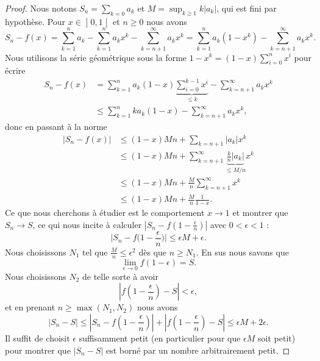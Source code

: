 \begin{proof}
    Nous notons \( S_n=\sum_{k=0}a_k\) et \( M=\sup_{k\geq 1}k| a_k |\), qui est fini par hypothèse. Pour \( x\in \mathopen] 0 , 1 \mathclose[\) et \( n\geq 0\) nous avons
    \begin{equation}
        S_n-f(x)=\sum_{k=1}^na_k-\sum_{k=1}^na_kx^k-\sum_{k=n+1}^{\infty}a_kx^k=\sum_{k=1}^na_k(1-x^k)-\sum_{k=n+1}^{\infty}a_kx^k.
    \end{equation}
    Nous utilisons la série géométrique sous la forme \( 1-x^k=(1-x)\sum_{i=0}^nx^i\) pour écrire
    \begin{subequations}
        \begin{align}
            S_n-f(x)&=\sum_{k=1}^na_k(1-x)\underbrace{\sum_{i=0}^{k-1}x^i}_{\leq k}-\sum_{k=n+1}^{\infty}a_kx^k\\
            &\leq\sum_{k=1}^nka_k(1-x)-\sum_{k=n+1}^{\infty}a_kx^k,
        \end{align}
    \end{subequations}
    donc en passant à la norme
    \begin{subequations}
        \begin{align}
            \big| S_n-f(x) \big|&\leq (1-x)Mn+\sum_{k=n+1}| a_k |x^k\\
            &\leq (1-x)Mn+\sum_{k=n+1}^{\infty}\underbrace{\frac{ k }{ n }| a_k |}_{\leq M/n}x^k\\
            &\leq (1-x)Mn+\frac{ M }{ n }\sum_{k=n+1}^{\infty}x^k\\
            &\leq (1-x)Mn+\frac{ M }{ n }\frac{1}{ 1-x }.
        \end{align}
    \end{subequations}
    Ce que nous cherchons à étudier est le comportement \( x\to 1\) et montrer que \( S_n\to S\), ce qui nous incite à calculer \( | S_n-f(1-\frac{ \epsilon }{n  }) |\) avec \( 0<\epsilon<1\) :
    \begin{equation}
        \big| S_n-f\big( 1-\frac{ \epsilon }{ n } \big) \big|\leq \epsilon M+\epsilon.
    \end{equation}
    Nous choisissons \( N_1\) tel que \( \frac{ M }{ n }\leq \epsilon^2\) dès que \( n\geq N_1\). En sus nous savons que 
    \begin{equation}
        \lim_{\epsilon\to 0}f(1-\epsilon)=S.
    \end{equation}
    Nous choisissons \( N_2\) de telle sorte à avoir
    \begin{equation}
        \left| f\left( 1-\frac{ \epsilon }{ n } \right)-S \right| <\epsilon,
    \end{equation}
    et en prenant \( n\geq\max(N_1,N_2)\) nous avons
    \begin{equation}
        | S_n-S |\leq \left| S_n-f\left( 1-\frac{ \epsilon }{ n } \right) \right| +\left| f\left( 1-\frac{ \epsilon }{ n } \right)-S \right|  \leq \epsilon M+2\epsilon.
    \end{equation}
    Il suffit de choisit \( \epsilon\) suffisamment petit (en particulier pour que \( \epsilon M\) soit petit) pour montrer que \( | S_n-S |\) est borné par un nombre arbitrairement petit.
\end{proof}



